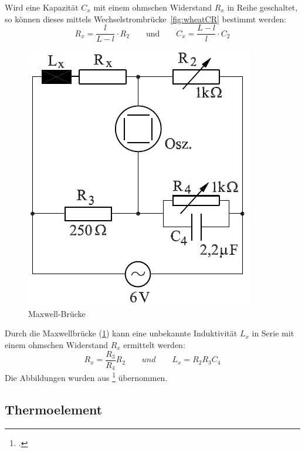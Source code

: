 Wird eine Kapazität $C_x$ mit einem ohmschen Widerstand $R_x$ in Reihe geschaltet, so können dieses mittels Wechselstrombrücke~\cref{fig:wheatCR} bestimmt werden:
\begin{equation}
  R_x=\frac{l}{L-l}\cdot R_2 \qquad \text{und} \qquad C_x=\frac{L-l}{l}\cdot C_2
  \label{eq:wheatCR}
\end{equation}
\begin{figure}[H]
  \centering
  \includegraphics{maxwell.jpg}
  \caption{Maxwell-Brücke}
  \label{fig:maxwell}
\end{figure}
Durch die Maxwellbrücke (\cref{fig:maxwell}) kann eine unbekannte Induktivität $L_x$ in Serie mit einem ohmschen Widerstand $R_x$ ermittelt werden:
\begin{equation}
  R_x=\frac{R_3}{R_4}R_2 \qquad und \qquad L_x=R_2 R_3 C_4
  \label{eq:maxwell}
\end{equation}
Die Abbildungen wurden aus \footcite{anleitung-ws2014} übernommen.
\subsection{Thermoelement}

